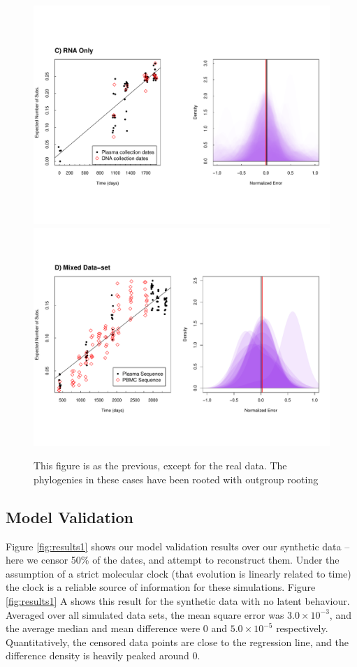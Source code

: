 \begin{figure} \label{fig:results2}
	\centering
	\includegraphics[trim=0cm 0cm 0cm 7cm, clip=true,scale=0.425]{figures/ancre.pdf}\\
	\includegraphics[trim=0cm 4cm 0cm 7cm, clip=true,scale=0.425]{figures/lanl.pdf}
	\caption[Examples]{This figure is as the previous, except for the real data.
The phylogenies in these cases have been rooted with outgroup rooting}
\end{figure}


\subsection{Model Validation} \label{sec:sim_results}
Figure \ref{fig:results1} shows our model validation results over our synthetic data -- here we censor 50\% of the dates, and attempt to reconstruct them. 
Under the assumption of a strict molecular clock (that evolution is linearly related to time) the clock is a reliable source of information for these simulations.
Figure \ref{fig:results1} A shows this result for the synthetic data with no latent behaviour.
Averaged over all simulated data sets, the mean square error was $3.0\times 10^{-3}$, and the average median and mean difference were 0 and $5.0\times 10^{-5}$ respectively. 
Quantitatively, the censored data points are close to the regression line, and the difference density is heavily peaked around 0. 

